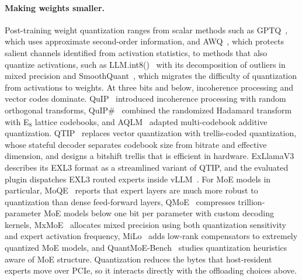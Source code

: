 \paragraph{Making weights smaller.}
Post-training weight quantization ranges from scalar methods such as GPTQ~\citep{frantar2023gptq}, which uses
approximate second-order information, and AWQ~\citep{lin2024awq}, which protects salient channels identified from
activation statistics, to methods that also quantize activations, such as LLM.int8()~\citep{dettmers2022llmint8} with
its decomposition of outliers in mixed precision and SmoothQuant~\citep{xiao2023smoothquant}, which migrates the
difficulty of quantization from activations to weights. At three bits and below, incoherence processing and vector
codes dominate. QuIP~\citep{chee2023quip} introduced incoherence processing with random orthogonal transforms,
QuIP\#~\citep{tseng2024quipsharp} combined the randomized Hadamard transform with E$_8$ lattice codebooks, and
AQLM~\citep{egiazarian2024aqlm} adapted multi-codebook additive quantization. QTIP~\citep{tseng2024qtip} replaces
vector quantization with trellis-coded quantization, whose stateful decoder separates codebook size from bitrate and
effective dimension, and designs a bitshift trellis that is efficient in hardware. ExLlamaV3~\citep{turboderp2026exllamav3}
describes its EXL3 format as a streamlined variant of QTIP, and the evaluated plugin dispatches EXL3 routed experts
inside vLLM~\citep{vcruz2026vllmexl3}. For MoE models in particular, MoQE~\citep{kim2023moqe} reports that expert
layers are much more robust to quantization than dense feed-forward layers, QMoE~\citep{frantar2024qmoe} compresses
trillion-parameter MoE models below one bit per parameter with custom decoding kernels, MxMoE~\citep{duanmu2025mxmoe}
allocates mixed precision using both quantization sensitivity and expert activation frequency, MiLo~\citep{huang2025milo}
adds low-rank compensators to extremely quantized MoE models, and QuantMoE-Bench~\citep{li2024quantmoebench} studies
quantization heuristics aware of MoE structure. Quantization reduces the bytes that host-resident experts move over
PCIe, so it interacts directly with the offloading choices above.

